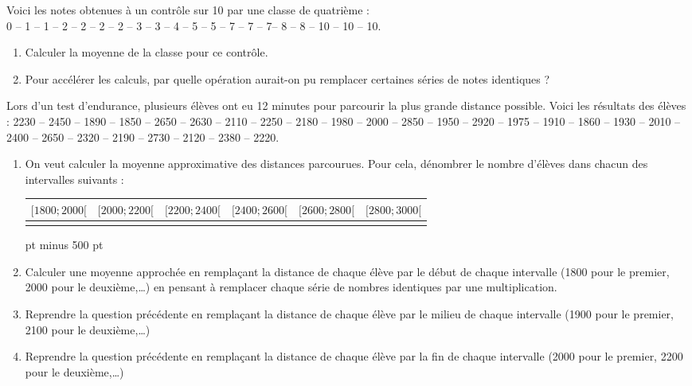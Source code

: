 \documentclass[10pt]{article}
\begin{document}
{\begin{Exo}
Voici les notes obtenues à un contrôle sur 10 par une classe de quatrième :\\
0 -- 1 -- 1 -- 2 -- 2 -- 2 -- 2 -- 3 -- 3 -- 4 -- 5 -- 5 -- 7 -- 7 -- 7--
8 -- 8 -- 10 -- 10 -- 10.
\begin{enumerate}
\item Calculer la moyenne de la classe pour ce contrôle.
\item Pour accélérer les calculs, par quelle opération aurait-on pu
	remplacer certaines séries de notes identiques ?
\end{enumerate}
\end{Exo}

\begin{Exo}
Lors d'un test d'endurance, plusieurs élèves ont eu 12 minutes pour
parcourir la plus grande distance possible. Voici les résultats des
élèves :
2230 -- 2450 -- 1890 -- 1850 -- 2650 -- 2630 -- 2110 -- 2250 -- 2180 --
1980 -- 2000 -- 2850 -- 1950 -- 2920 -- 1975 -- 1910 -- 1860 -- 1930 --
2010 -- 2400 -- 2650 -- 2320 -- 2190 -- 2730 -- 2120 -- 2380 -- 2220.

\begin{enumerate}
\item
On veut calculer la moyenne approximative des distances parcourues.
Pour cela, dénombrer le nombre d'élèves dans chacun des intervalles
suivants :\\
\begin{tabular}{|*{6}{c|}}
\hline
$[1800 ; 2000 [$ & $[2000 ; 2200 [$ &
$[2200 ; 2400 [$ & $[2400 ; 2600 [$ &
$[2600 ; 2800 [$ & $[2800 ; 3000 [$ \\
\hline
&&
 &&& \\
\hline
\end{tabular} pt minus 500 pt\strut
\item
Calculer une moyenne approchée en remplaçant la distance de chaque élève
	par le début de chaque intervalle (1800 pour le premier, 2000 pour
	le deuxième,\dots) en pensant à remplacer chaque série de nombres
	identiques par une multiplication.
	
\item Reprendre la question précédente en 
	remplaçant la distance de chaque élève
	par le milieu de chaque intervalle (1900 pour le premier, 2100 pour
	le deuxième,\dots)
	
\item Reprendre la question précédente en 
	remplaçant la distance de chaque élève
	par la fin de chaque intervalle (2000 pour le premier, 2200 pour
	le deuxième,\dots)
	

\end{enumerate}
\end{Exo}}
\end{document}

